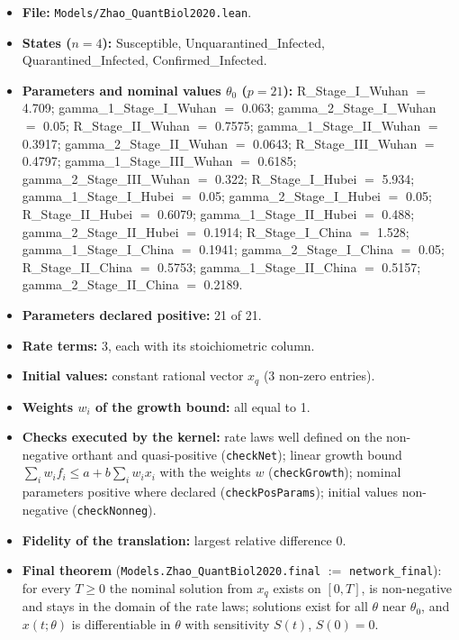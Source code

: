 \begin{itemize}\itemsep0pt\small
\item \textbf{File:} \texttt{Models/Zhao\_QuantBiol2020.lean}.
\item \textbf{States ($n=4$):} Susceptible, Unquarantined\_Infected, Quarantined\_Infected, Confirmed\_Infected.
\item \textbf{Parameters and nominal values $\theta_0$ ($p=21$):} R\_Stage\_I\_Wuhan $=$ 4.709; gamma\_1\_Stage\_I\_Wuhan $=$ 0.063; gamma\_2\_Stage\_I\_Wuhan $=$ 0.05; R\_Stage\_II\_Wuhan $=$ 0.7575; gamma\_1\_Stage\_II\_Wuhan $=$ 0.3917; gamma\_2\_Stage\_II\_Wuhan $=$ 0.0643; R\_Stage\_III\_Wuhan $=$ 0.4797; gamma\_1\_Stage\_III\_Wuhan $=$ 0.6185; gamma\_2\_Stage\_III\_Wuhan $=$ 0.322; R\_Stage\_I\_Hubei $=$ 5.934; gamma\_1\_Stage\_I\_Hubei $=$ 0.05; gamma\_2\_Stage\_I\_Hubei $=$ 0.05; R\_Stage\_II\_Hubei $=$ 0.6079; gamma\_1\_Stage\_II\_Hubei $=$ 0.488; gamma\_2\_Stage\_II\_Hubei $=$ 0.1914; R\_Stage\_I\_China $=$ 1.528; gamma\_1\_Stage\_I\_China $=$ 0.1941; gamma\_2\_Stage\_I\_China $=$ 0.05; R\_Stage\_II\_China $=$ 0.5753; gamma\_1\_Stage\_II\_China $=$ 0.5157; gamma\_2\_Stage\_II\_China $=$ 0.2189.
\item \textbf{Parameters declared positive:} 21 of 21.
\item \textbf{Rate terms:} 3, each with its stoichiometric column.
\item \textbf{Initial values:} constant rational vector $x_q$ (3 non-zero entries).
\item \textbf{Weights $w_i$ of the growth bound:} all equal to 1.
\item \textbf{Checks executed by the kernel:} rate laws well defined on the non-negative orthant and quasi-positive (\texttt{checkNet}); linear growth bound $\sum_iw_if_i\le a+b\sum_iw_ix_i$ with the weights $w$ (\texttt{checkGrowth}); nominal parameters positive where declared (\texttt{checkPosParams}); initial values non-negative (\texttt{checkNonneg}).
\item \textbf{Fidelity of the translation:} largest relative difference 0.
\item \textbf{Final theorem} (\texttt{Models.Zhao\_QuantBiol2020.final} $:=$ \texttt{network\_final}): for every $T\ge0$ the nominal solution from $x_q$ exists on $[0,T]$, is non-negative and stays in the domain of the rate laws; solutions exist for all $\theta$ near $\theta_0$, and $x(t;\theta)$ is differentiable in $\theta$ with sensitivity $S(t)$, $S(0)=0$.
\end{itemize}

